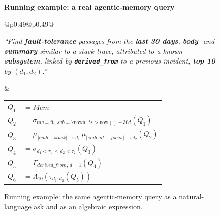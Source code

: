 \documentclass[sigconf]{acmart}
\theoremstyle{plain}
\theoremstyle{definition}
\theoremstyle{remark}
\begin{document}
\begin{figure}[t]
  \centering
  {\bfseries Running example: a real agentic-memory query}\par\vspace{4pt}
  \noindent
  \begin{tabular}{@{}p{0.49\linewidth}@{\hspace{0.02\linewidth}}p{0.49\linewidth}@{}}
    \begin{minipage}[t]{\linewidth}\vspace*{-2.5\baselineskip}\itshape\small\noindent ``Find \textcolor{mosaicCrimson}{\textbf{fault-tolerance}} passages from the \textcolor{mosaicCrimson}{\textbf{last 30 days}}, \textcolor{mosaicCrimson}{\textbf{body}}- and \textcolor{mosaicCrimson}{\textbf{summary}}-similar to a stack trace, attributed to a known \textcolor{mosaicCrimson}{\textbf{subsystem}}, linked by \textcolor{mosaicCrimson}{\textbf{\texttt{derived\_from}}} to a previous incident, \textcolor{mosaicCrimson}{\textbf{top 10}} by $(d_1, d_2)$.''\end{minipage}
    &
    \ttfamily\small\noindent
    \begin{tabular}{@{}l@{\hspace{2pt}}l@{}}
      $Q_1$ & $= \mathit{Mem}$\\
      $Q_2$ & $= \sigma_{\mathit{tag}=\mathrm{ft},\ \mathit{sub}=\mathrm{known},\ \mathit{ts}>\mathrm{now}()-30d}(Q_1)$\\
      $Q_3$ & $= \mu_{\Vert\mathit{emb}-\mathit{stack}\Vert\to d_1}\,
               \mu_{\Vert\mathit{emb\_alt}-\mathit{focus}\Vert\to d_2}(Q_2)$\\
      $Q_4$ & $= \sigma_{d_1<\tau_1\ \wedge\ d_2<\tau_2}(Q_3)$\\
      $Q_5$ & $= \Gamma_{\mathit{derived\_from},\,d=1}(Q_4)$\\
      $Q_6$ & $= \Lambda_{10}(\tau_{d_1, d_2}(Q_5))$
    \end{tabular}
  \end{tabular}
  \caption{Running example: the same agentic-memory query as a natural-language ask and as an algebraic expression.}
  \label{fig:threelayer}
\end{figure}
\end{document}
